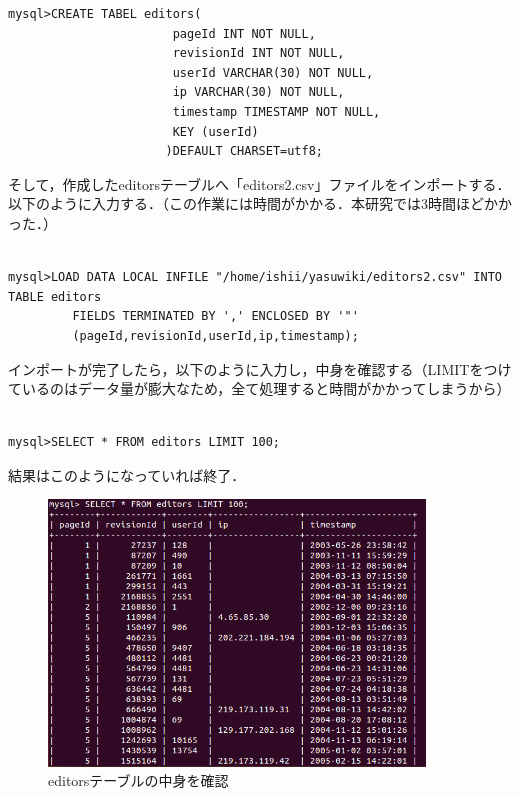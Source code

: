 {\small
\begin{verbatim}
mysql>CREATE TABEL editors(
                       pageId INT NOT NULL,
                       revisionId INT NOT NULL,
                       userId VARCHAR(30) NOT NULL,
                       ip VARCHAR(30) NOT NULL,
                       timestamp TIMESTAMP NOT NULL,
                       KEY (userId)
                      )DEFAULT CHARSET=utf8;
\end{verbatim}}

そして，作成したeditorsテーブルへ「editors2.csv」ファイルをインポートする．以下のように入力する．（この作業には時間がかかる．本研究では3時間ほどかかった．）

{\small
\begin{verbatim}

mysql>LOAD DATA LOCAL INFILE "/home/ishii/yasuwiki/editors2.csv" INTO TABLE editors
         FIELDS TERMINATED BY ',' ENCLOSED BY '"'
         (pageId,revisionId,userId,ip,timestamp);

\end{verbatim}}

インポートが完了したら，以下のように入力し，中身を確認する（LIMITをつけているのはデータ量が膨大なため，全て処理すると時間がかかってしまうから）

{\small
\begin{verbatim}

mysql>SELECT * FROM editors LIMIT 100;

\end{verbatim}}


\clearpage

結果はこのようになっていれば終了．

\begin{figure}[H]
\centering
\includegraphics[width=10cm]{editors_table_check.png}
\caption{editorsテーブルの中身を確認}\label{サンプル図}
\end{figure}

